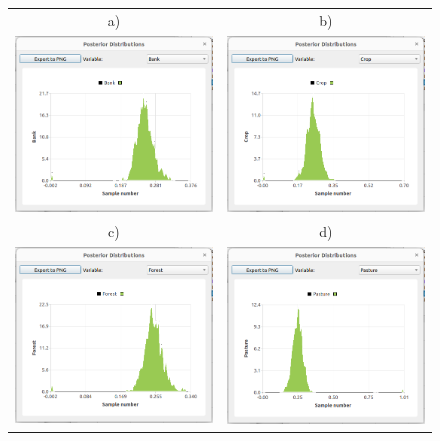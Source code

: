 \documentclass[12pt]{report}
\begin{document}
\begin{figure}[ht]
    \centering
    \begin{tabular}{c c}
        a) & b) \\
        \includegraphics[width=8cm]{Figures/Error_Analysis_Bank.png} & \includegraphics[width=8cm]{Figures/Error_Analysis_crop.png}\\
        c) & d) \\
        \includegraphics[width=8cm]{Figures/Error_Analysis_forest.png} & \includegraphics[width=8cm]{Figures/Error_Analysis_pasture.png}

\end{tabular}
\end{figure}
\end{document}
